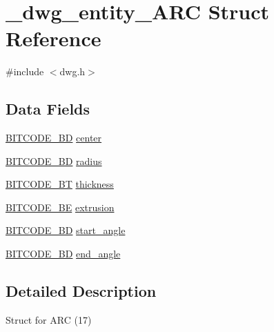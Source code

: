 \hypertarget{struct__dwg__entity__ARC}{\section{\-\_\-dwg\-\_\-entity\-\_\-\-A\-R\-C \-Struct \-Reference}
\label{struct__dwg__entity__ARC}
}


{\ttfamily \#include $<$dwg.\-h$>$}

\subsection*{\-Data \-Fields}
\begin{DoxyCompactItemize}
\item 
\hyperlink{dwg_8h_a00698ef1bb072aa0a9360c6fc1c57587}{\-B\-I\-T\-C\-O\-D\-E\-\_\-B\-D} \hyperlink{struct__dwg__entity__ARC_a9221b3d6ccb9f55d074ee0f6af58903d}{center}
\item 
\hyperlink{dwg_8h_a3c1e6781466b74ba07785d57da70ed97}{\-B\-I\-T\-C\-O\-D\-E\-\_\-\-B\-D} \hyperlink{struct__dwg__entity__ARC_a5def3ee0e686707358ff621d1118ccfe}{radius}
\item 
\hyperlink{dwg_8h_afc93a5ddc38aeff965d4e93c71514495}{\-B\-I\-T\-C\-O\-D\-E\-\_\-\-B\-T} \hyperlink{struct__dwg__entity__ARC_a0bf7ed5a5b32f948f2a3c6bde43818bc}{thickness}
\item 
\hyperlink{dwg_8h_ac2622137c01aa3a719ec6c571d06ee6a}{\-B\-I\-T\-C\-O\-D\-E\-\_\-\-B\-E} \hyperlink{struct__dwg__entity__ARC_aab03f6a95e3ff0324442ed5be547f173}{extrusion}
\item 
\hyperlink{dwg_8h_a3c1e6781466b74ba07785d57da70ed97}{\-B\-I\-T\-C\-O\-D\-E\-\_\-\-B\-D} \hyperlink{struct__dwg__entity__ARC_ae19dcc3fe6a4bbfcee25e4f2e22bcd2b}{start\-\_\-angle}
\item 
\hyperlink{dwg_8h_a3c1e6781466b74ba07785d57da70ed97}{\-B\-I\-T\-C\-O\-D\-E\-\_\-\-B\-D} \hyperlink{struct__dwg__entity__ARC_aa40f63e41825985f8ebf8ddddbd7561a}{end\-\_\-angle}
\end{DoxyCompactItemize}


\subsection{\-Detailed \-Description}
\-Struct for \-A\-R\-C (17) 


